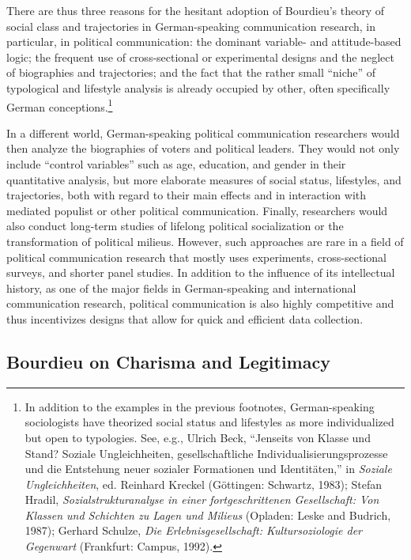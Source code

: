 \documentclass{tufte-handout}
\begin{document}
There are thus three reasons for the hesitant adoption of Bourdieu's
theory of social class and trajectories in German-speaking communication
research, in particular, in political communication: the dominant
variable- and attitude-based logic; the frequent use of cross-sectional
or experimental designs and the neglect of biographies and trajectories;
and the fact that the rather small ``niche'' of typological and
lifestyle analysis is already occupied by other, often specifically
German conceptions.\footnote{In addition to the examples in the previous
  footnotes, German-speaking sociologists have theorized social status
  and lifestyles as more individualized but open to typologies. See,
  e.g., Ulrich Beck, ``Jenseits von Klasse und Stand? Soziale
  Ungleichheiten, gesellschaftliche Individualisierungsprozesse und die
  Entstehung neuer sozialer Formationen und Identitäten,'' in
  \emph{Soziale Ungleichheiten}, ed. Reinhard Kreckel (Göttingen:
  Schwartz, 1983); Stefan Hradil, \emph{Sozialstrukturanalyse in einer
  fortgeschrittenen Gesellschaft: Von Klassen und Schichten zu Lagen und
  Milieus} (Opladen: Leske and Budrich, 1987); Gerhard Schulze,
  \emph{Die Erlebnisgesellschaft: Kultursoziologie der Gegenwart}
  (Frankfurt: Campus, 1992).}

In a different world, German-speaking political communication
researchers would then analyze the biographies of voters and political
leaders. They would not only include ``control variables'' such as age,
education, and gender in their quantitative analysis, but more elaborate
measures of social status, lifestyles, and trajectories, both with
regard to their main effects and in interaction with mediated populist
or other political communication. Finally, researchers would also
conduct long-term studies of lifelong political socialization or the
transformation of political milieus. However, such approaches are rare
in a field of political communication research that mostly uses
experiments, cross-sectional surveys, and shorter panel studies. In
addition to the influence of its intellectual history, as one of the
major fields in German-speaking and international communication
research, political communication is also highly competitive and thus
incentivizes designs that allow for quick and efficient data collection.

\hypertarget{bourdieu-on-charisma-and-legitimacy}{%
\subsection{Bourdieu on Charisma and
Legitimacy}\label{bourdieu-on-charisma-and-legitimacy}}
\end{document}
